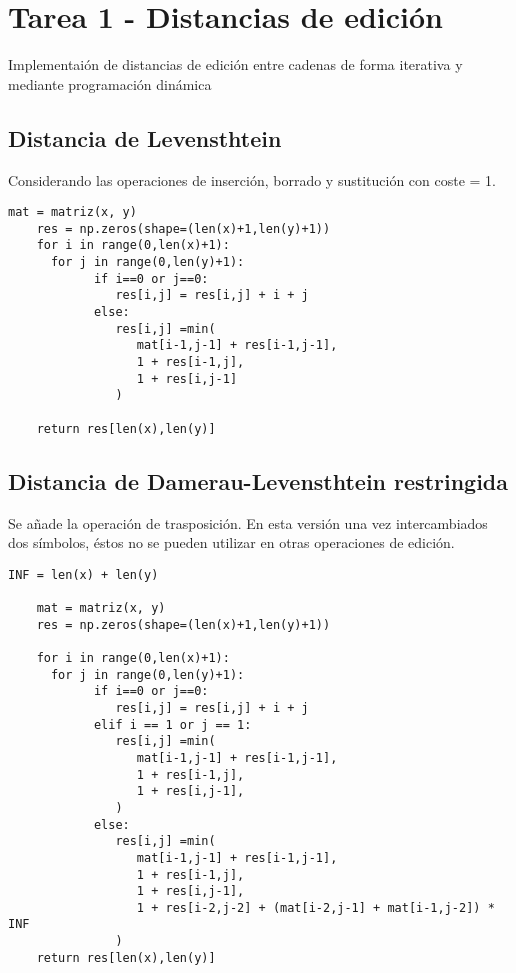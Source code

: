 \section{Tarea 1 - Distancias de edición}
Implementaión de distancias de edición entre cadenas de forma iterativa y mediante programación dinámica

\subsection{Distancia de Levensthtein}
Considerando las operaciones de inserción, borrado y sustitución con coste = 1.

\begin{lstlisting}[caption=Algoritmo distancia de levenshtein]
    mat = matriz(x, y)
    res = np.zeros(shape=(len(x)+1,len(y)+1))
    for i in range(0,len(x)+1):
      for j in range(0,len(y)+1):
            if i==0 or j==0:
               res[i,j] = res[i,j] + i + j
            else:
               res[i,j] =min(
                  mat[i-1,j-1] + res[i-1,j-1],
                  1 + res[i-1,j],
                  1 + res[i,j-1]
               )
               
    return res[len(x),len(y)]
\end{lstlisting}


\subsection{Distancia de Damerau-Levensthtein restringida}
Se añade la operación de trasposición. En esta versión una vez intercambiados dos
símbolos, éstos no se pueden utilizar en otras operaciones de edición.

\begin{lstlisting}[label={list:first},caption=Sample Python code -- Damerau-Levensthtein restringido]
    INF = len(x) + len(y)

    mat = matriz(x, y)
    res = np.zeros(shape=(len(x)+1,len(y)+1))

    for i in range(0,len(x)+1):
      for j in range(0,len(y)+1):
            if i==0 or j==0:
               res[i,j] = res[i,j] + i + j
            elif i == 1 or j == 1:
               res[i,j] =min(
                  mat[i-1,j-1] + res[i-1,j-1],
                  1 + res[i-1,j],
                  1 + res[i,j-1],
               )
            else:
               res[i,j] =min(
                  mat[i-1,j-1] + res[i-1,j-1],
                  1 + res[i-1,j],
                  1 + res[i,j-1],
                  1 + res[i-2,j-2] + (mat[i-2,j-1] + mat[i-1,j-2]) * INF
               )
    return res[len(x),len(y)]
\end{lstlisting}

